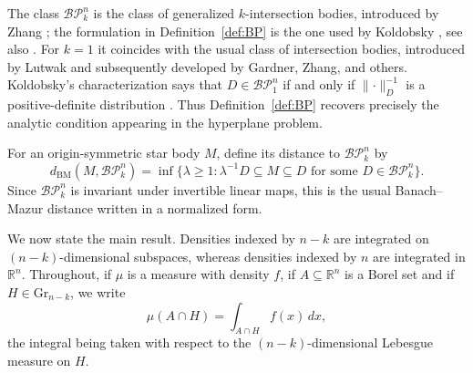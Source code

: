 \documentclass{amsart}
\theoremstyle{remark}
\newcommand{\R}{\mathbb{R}}
\newcommand{\BP}{\mathcal{BP}}
\newcommand{\Gr}{\mathrm{Gr}}
\newcommand{\dd}{\,d}
\begin{document}
The class $\BP_k^n$ is the class of generalized $k$-intersection bodies,
introduced by Zhang \cite{Zhang1996}; the formulation in
Definition~\ref{def:BP} is the one used by Koldobsky
\cite{Koldobsky2000}, see also \cite{KoldobskyBook}. For $k=1$ it coincides with
the usual class of intersection bodies, introduced by Lutwak
\cite{Lutwak1988} and subsequently developed by Gardner, Zhang, and others.
Koldobsky's characterization says that $D\in\BP_1^n$ if and only if
$\lVert\cdot\rVert_D^{-1}$ is a positive-definite distribution
\cite{Koldobsky1998}. Thus Definition~\ref{def:BP} recovers precisely the
analytic condition appearing in the hyperplane problem.

For an origin-symmetric star body $M$, define its distance to $\BP_k^n$ by
\begin{equation}\label{eq:distance}
 d_{\mathrm{BM}}(M,\BP_k^n)
 =\inf\bigl\{\lambda\geq1:
 \lambda^{-1}D\subseteq M\subseteq D
 \text{ for some }D\in\BP_k^n\bigr\}.
\end{equation}
Since $\BP_k^n$ is invariant under invertible linear maps, this is the usual
Banach--Mazur distance written in a normalized form.

We now state the main result. Densities indexed by $n-k$ are integrated on
$(n-k)$-dimensional subspaces, whereas densities indexed by $n$ are integrated
in $\R^n$. Throughout, if $\mu$ is a measure with density $f$, if $A\subseteq
\R^n$ is a Borel set and if $H\in\Gr_{n-k}$, we write
\[
 \mu(A\cap H)=\int_{A\cap H}f(x)\dd x,
\]
the integral being taken with respect to the $(n-k)$-dimensional Lebesgue
measure on $H$.
\end{document}
